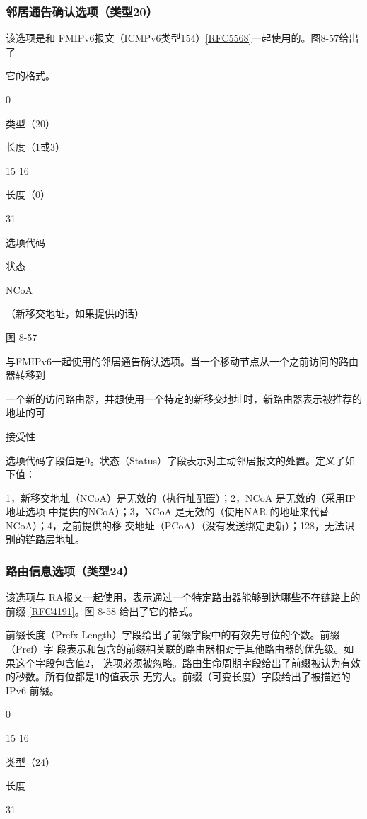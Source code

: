\subsubsection{邻居通告确认选项（类型20）}
该选项是和 FMIPv6报文（ICMPv6类型154）\href{https://www.rfc-editor.org/rfc/rfc5568}{[RFC5568]}一起使用的。图8-57给出了

它的格式。

0

类型（20）

长度（1或3）

15 16

长度（0）

31

选项代码

状态

NCoA

（新移交地址，如果提供的话）

图 8-57

与FMIPv6一起使用的邻居通告确认选项。当一个移动节点从一个之前访问的路由器转移到

一个新的访问路由器，并想使用一个特定的新移交地址时，新路由器表示被推荐的地址的可

接受性

选项代码字段值是0。状态（Status）字段表示对主动邻居报文的处置。定义了如下值：

1，新移交地址（NCoA）是无效的（执行址配置）；2，NCoA 是无效的（采用IP地址选项
中提供的NCoA）；3，NCoA 是无效的（使用NAR 的地址来代替NCoA）；4，之前提供的移
交地址（PCoA）（没有发送绑定更新）；128，无法识别的链路层地址。

\subsubsection{路由信息选项（类型24）}
该选项与 RA报文一起使用，表示通过一个特定路由器能够到达哪些不在链路上的前缀
\href{https://www.rfc-editor.org/rfc/rfc4191}{[RFC4191]}。图 8-58 给出了它的格式。

前缀长度（Prefx Length）字段给出了前缀字段中的有效先导位的个数。前缀（Pref）字
段表示和包含的前缀相关联的路由器相对于其他路由器的优先级。如果这个字段包含值2，
选项必须被忽略。路由生命周期字段给出了前缀被认为有效的秒数。所有位都是1的值表示
无穷大。前缀（可变长度）字段给出了被描述的IPv6 前缀。

0

15 16

类型（24）

长度

31

